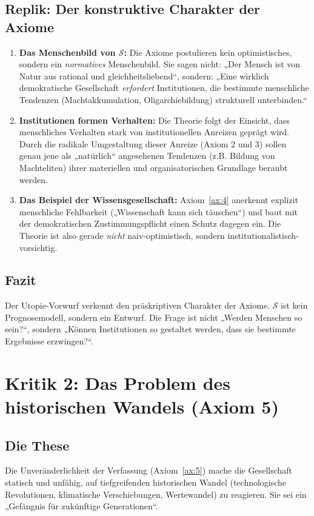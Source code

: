 \subsection{Replik: Der konstruktive Charakter der Axiome}
\begin{enumerate}
    \item \textbf{Das Menschenbild von $\mathcal{S}$:} Die Axiome postulieren kein optimistisches, sondern ein \emph{normatives} Menschenbild. Sie sagen nicht: „Der Mensch ist von Natur aus rational und gleichheitsliebend“, sondern: „Eine wirklich demokratische Gesellschaft \emph{erfordert} Institutionen, die bestimmte menschliche Tendenzen (Machtakkumulation, Oligarchiebildung) strukturell unterbinden.“
    \item \textbf{Institutionen formen Verhalten:} Die Theorie folgt der Einsicht, dass menschliches Verhalten stark von institutionellen Anreizen geprägt wird. Durch die radikale Umgestaltung dieser Anreize (Axiom 2 und 3) sollen genau jene als „natürlich“ angesehenen Tendenzen (z.B. Bildung von Machteliten) ihrer materiellen und organisatorischen Grundlage beraubt werden.
    \item \textbf{Das Beispiel der Wissensgesellschaft:} Axiom~\ref{ax:4} anerkennt explizit menschliche Fehlbarkeit („Wissenschaft kann sich täuschen“) und baut mit der demokratischen Zustimmungspflicht einen Schutz dagegen ein. Die Theorie ist also gerade \emph{nicht} naiv-optimistisch, sondern institutionalistisch-vorsichtig.
\end{enumerate}

\subsection{Fazit}
Der Utopie-Vorwurf verkennt den präskriptiven Charakter der Axiome. $\mathcal{S}$ ist kein Prognosemodell, sondern ein Entwurf. Die Frage ist nicht „Werden Menschen so sein?“, sondern „Können Institutionen so gestaltet werden, dass sie bestimmte Ergebnisse erzwingen?“.

\section{Kritik 2: Das Problem des historischen Wandels (Axiom 5)}

\subsection{Die These}
Die Unveränderlichkeit der Verfassung (Axiom~\ref{ax:5}) mache die Gesellschaft statisch und unfähig, auf tiefgreifenden historischen Wandel (technologische Revolutionen, klimatische Verschiebungen, Wertewandel) zu reagieren. Sie sei ein „Gefängnis für zukünftige Generationen“.

